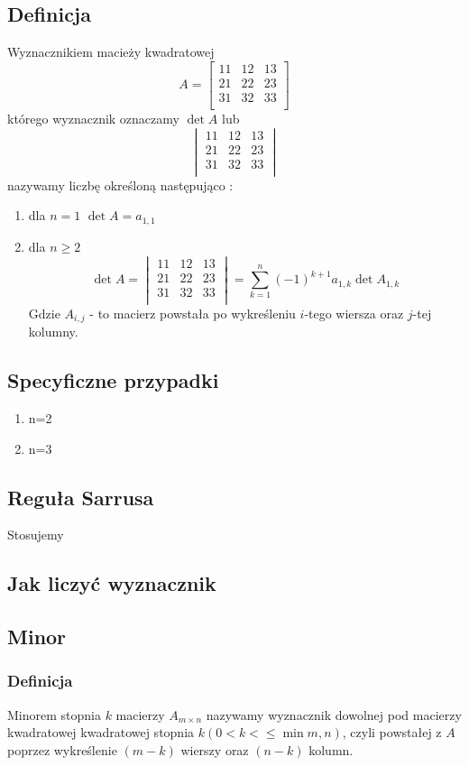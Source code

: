 \documentclass[11pt]{article}
\begin{document}
\subsection{Definicja}
Wyznacznikiem macieży kwadratowej $$ A = \begin{bmatrix}
	11 & 12 & 13\\
	21 & 22 & 23\\
	31 & 32 & 33\\
\end{bmatrix}$$
którego wyznacznik oznaczamy $ \det{A} $ lub $$\begin{vmatrix}
	11 & 12 & 13\\
	21 & 22 & 23\\
	31 & 32 & 33\\
\end{vmatrix}$$
nazywamy liczbę określoną następująco :
\begin{enumerate}
\item{dla $n=1$ $\det{A} = a_{1,1}$}
\item{dla $n \geq 2$ $$ \det{A} = \begin{vmatrix}
	11 & 12 & 13\\
	21 & 22 & 23\\
	31 & 32 & 33\\
\end{vmatrix} = \sum_{k=1}^{n}{(-1)^{k+1} a_{1,k} \det{A_{1,k}}}$$
Gdzie $A_{i,j}$ - to macierz powstała po wykreśleniu $i$-tego wiersza oraz $j$-tej kolumny.}
\end{enumerate}
\subsection{Specyficzne przypadki}
\begin{enumerate}
\item{n=2}
\item{n=3}
\end{enumerate}
\subsection{Reguła Sarrusa}
Stosujemy 
\subsection{Jak liczyć wyznacznik}
\subsection{Minor}
\subsubsection{Definicja}
Minorem stopnia $k$ macierzy $A_{m \times n}$ nazywamy wyznacznik dowolnej pod macierzy kwadratowej kwadratowej stopnia $k ( 0 < k <\leq \min{m,n})$, czyli powstałej z $A$ poprzez wykreślenie $(m-k)$ wierszy oraz $(n-k)$ kolumn.
\end{document}
